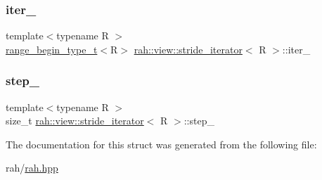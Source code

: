 \subsubsection{\texorpdfstring{iter\_}{iter\_}}
{\footnotesize\ttfamily template$<$typename R $>$ \\
\mbox{\hyperlink{namespacerah_afa7f59d1f37c7b9d9caed37551be9eaa}{range\+\_\+begin\+\_\+type\+\_\+t}}$<$R$>$ \mbox{\hyperlink{structrah_1_1view_1_1stride__iterator}{rah\+::view\+::stride\+\_\+iterator}}$<$ R $>$\+::iter\+\_\+}

\mbox{\label{structrah_1_1view_1_1stride__iterator_a1b2e6cfb0631cde24284f56b17a4452c}} 
\subsubsection{\texorpdfstring{step\_}{step\_}}
{\footnotesize\ttfamily template$<$typename R $>$ \\
size\+\_\+t \mbox{\hyperlink{structrah_1_1view_1_1stride__iterator}{rah\+::view\+::stride\+\_\+iterator}}$<$ R $>$\+::step\+\_\+}



The documentation for this struct was generated from the following file\+:\begin{DoxyCompactItemize}
\item 
rah/\mbox{\hyperlink{rah_8hpp}{rah.\+hpp}}\end{DoxyCompactItemize}
